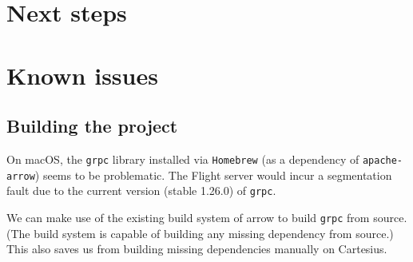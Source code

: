 \documentclass{article}
\begin{document}
\section{Next steps}

\appendix
\section{Known issues}
\subsection{Building the project}

On macOS, the \texttt{grpc} library installed via \texttt{Homebrew} (as a dependency of \texttt{apache-arrow}) seems to be problematic.
The Flight server would incur a segmentation fault due to the current version (stable 1.26.0) of \texttt{grpc}.

We can make use of the existing build system of arrow to build \texttt{grpc} from source.
(The build system is capable of building any missing dependency from source.)
This also saves us from building missing dependencies manually on Cartesius.
\end{document}
